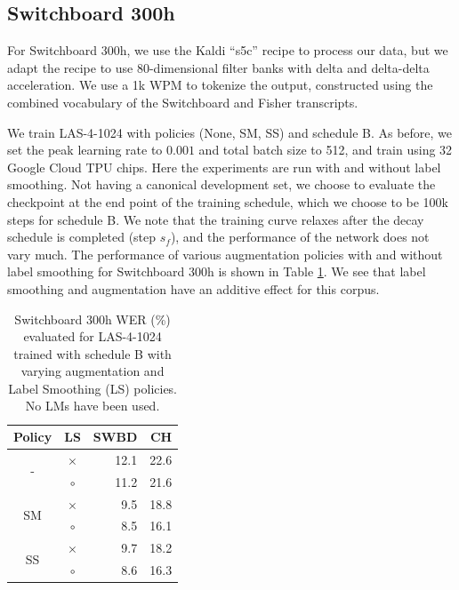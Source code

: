 \documentclass[a4paper]{article}
\begin{document}
\subsection{Switchboard 300h} \label{ss:swbd}

For Switchboard 300h, we use the Kaldi \cite{povey-asru-2011} ``s5c'' recipe to process our data, but we adapt the recipe to use 80-dimensional filter banks with delta and delta-delta acceleration. We use a 1k WPM \cite{schuster-icassp-2012} to tokenize the output, constructed using the combined vocabulary of the Switchboard and Fisher transcripts.

We train LAS-4-1024 with policies (None, SM, SS) and schedule B. As before, we set the peak learning rate to $0.001$ and total batch size to 512, and train using 32 Google Cloud TPU chips. Here the experiments are run with and without label smoothing. Not having a canonical development set, we choose to evaluate the checkpoint at the end point of the training schedule, which we choose to be 100k steps for schedule B. We note that the training curve relaxes after the decay schedule is completed (step $s_f$), and the performance of the network does not vary much. The performance of various augmentation policies with and without label smoothing for Switchboard 300h is shown in Table \ref{t:SWBD}. We see that label smoothing and augmentation have an additive effect for this corpus.

\begin{table}[h!]
  \vskip -0.1in
  \caption{Switchboard 300h WER (\%) evaluated for LAS-4-1024 trained with schedule B with varying augmentation and Label Smoothing (LS) policies. No LMs have been used.}
  \footnotesize
  \label{t:SWBD}
  \centering
  \begin{tabular}{ccrr}
    \toprule
    {\bfseries Policy} & {\bfseries LS} & {\bfseries SWBD} & {\bfseries CH} \\
    \midrule
    \multirow{2}{*}{-} & $\times$ & 12.1 & 22.6 \\
    & $\circ$ & 11.2 & 21.6 \\
    \midrule
    \multirow{2}{*}{SM}& $\times$ & 9.5 & 18.8 \\
    & $\circ$ & 8.5 & 16.1 \\
    \midrule
    \multirow{2}{*}{SS} & $\times$ & 9.7 & 18.2 \\
    & $\circ$ & 8.6 & 16.3 \\
    \bottomrule
  \end{tabular}
\end{table}
\end{document}
